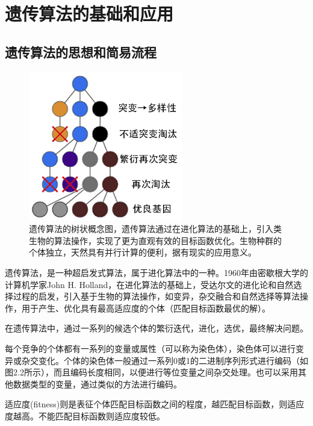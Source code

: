 \chapter{遗传算法的基础和应用}\label{chap:2}

\section{遗传算法的思想和简易流程}

\begin{figure}[!htbp]
    \centering
    \includegraphics[width=0.6\textwidth]{Img/2-1.png}
    \caption{遗传算法的树状概念图，遗传算法通过在进化算法的基础上，引入类生物的算法操作，实现了更为直观有效的目标函数优化。生物种群的个体独立，天然具有并行计算的便利，据有现实的应用意义。}
    \label{fig:2-1}
\end{figure}

遗传算法，是一种超启发式算法，属于进化算法中的一种。1960年由密歇根大学的计算机学家John H. Holland，在进化算法的基础上，受达尔文的进化论和自然选择过程的启发，引入基于生物的算法操作，如变异，杂交融合和自然选择等算法操作，用于产生、优化具有最高适应度的个体（匹配目标函数最优的解）。\cite{Genetic,2011yanshuhua}

在遗传算法中，通过一系列的候选个体的繁衍迭代，进化，选优，最终解决问题。

每个竞争的个体都有一系列的变量或属性（可以称为染色体），染色体可以进行变异或杂交变化。个体的染色体一般通过一系列0或1的二进制序列形式进行编码（如图2.2所示），而且编码长度相同，以便进行等位变量之间杂交处理。也可以采用其他数据类型的变量，通过类似的方法进行编码。

适应度(fitness)则是表征个体匹配目标函数之间的程度，越匹配目标函数，则适应度越高。不能匹配目标函数则适应度较低。

